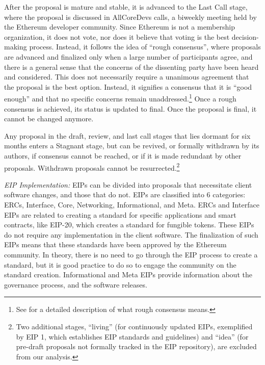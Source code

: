 \documentclass[No]{AEA}
\begin{document}
After the proposal is mature and stable, it is advanced to the Last Call stage, where the proposal is discussed in AllCoreDevs calls, a biweekly meeting held by the Ethereum developer community. Since Ethereum is not a membership organization, it does not vote, nor does it believe that voting is the best decision-making process. Instead, it follows the idea of ``rough consensus'', where proposals are advanced and finalized only when a large number of participants agree, and there is a general sense that the concerns of the dissenting party have been heard and considered. This does not necessarily require a unanimous agreement that the proposal is the best option. Instead, it signifies a consensus that it is ``good enough'' and that no specific concerns remain unaddressed.\footnote{See \cite{Resnick2014} for a detailed description of what rough consensus means.} Once a rough consensus is achieved, its status is updated to final. Once the proposal is final, it cannot be changed anymore.

Any proposal in the draft, review, and last call stages that lies dormant for six months enters a Stagnant stage, but can be revived, or formally withdrawn by its authors, if consensus cannot be reached, or if it is made redundant by other proposals. Withdrawn proposals cannot be resurrected.\footnote{Two additional stages, ``living'' (for continuously updated EIPs, exemplified by EIP 1, which establishes EIP standards and guidelines) and ``idea'' (for pre-draft proposals not formally tracked in the EIP repository), are excluded from our analysis.} 

\textit{EIP Implementation:}  EIPs can be divided into proposals that necessitate client software changes, and those that do not. EIPs are classified into 6 categories: ERCs, Interface, Core, Networking, Informational, and Meta. ERCs and Interface EIPs are related to creating a standard for specific applications and smart contracts, like EIP-20, which creates a standard for fungible tokens. These EIPs do not require any implementation in the client software. The finalization of such EIPs means that these standards have been approved by the Ethereum community. In theory, there is no need to go through the EIP process to create a standard, but it is good practice to do so to engage the community on the standard creation. Informational and Meta EIPs provide information about the governance process, and the software releases. 
\end{document}

